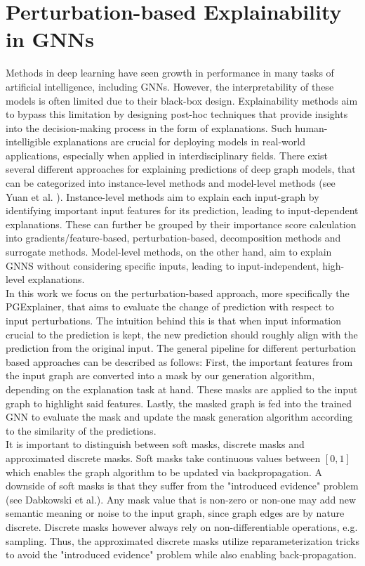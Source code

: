 \section{Perturbation-based Explainability in GNNs}
Methods in deep learning have seen growth in performance in many tasks of artificial intelligence, including GNNs. However, the interpretability of these models is often limited due to their black-box design. Explainability methods aim to bypass this limitation by designing post-hoc techniques that provide insights into the decision-making process in the form of explanations. Such human-intelligible explanations are crucial for deploying models in real-world applications, especially when applied in interdisciplinary fields. There exist several different approaches for explaining predictions of deep graph models, that can be categorized into instance-level methods and model-level methods (see Yuan et al. \cite{yuan2022explainability}). Instance-level methods aim to explain each input-graph by identifying important input features for its prediction, leading to input-dependent explanations. These can further be grouped by their importance score calculation into gradients/feature-based, perturbation-based, decomposition methods and surrogate methods. Model-level methods, on the other hand, aim to explain GNNS without considering specific inputs, leading to input-independent, high-level explanations. \\
In this work we focus on the perturbation-based approach, more specifically the PGExplainer\cite{luo2020parameterized}, that aims to evaluate the change of prediction with respect to input perturbations. The intuition behind this is that when input information crucial to the prediction is kept, the new prediction should roughly align with the prediction from the original input. The general pipeline for different perturbation based approaches can be described as follows: First, the important features from the input graph are converted into a mask by our generation algorithm, depending on the explanation task at hand. These masks are applied to the input graph to highlight said features. Lastly, the masked graph is fed into the trained GNN to evaluate the mask and update the mask generation algorithm according to the similarity of the predictions. \\
It is important to distinguish between soft masks, discrete masks and approximated discrete masks. Soft masks take continuous values between $[0,1]$ which enables the graph algorithm to be updated via backpropagation. A downside of soft masks is that they suffer from the "introduced evidence" problem (see Dabkowski et al.\cite{dabkowski2017real}). Any mask value that is non-zero or non-one may add new semantic meaning or noise to the input graph, since graph edges are by nature discrete. Discrete masks however always rely on non-differentiable operations, e.g. sampling. Thus, the approximated discrete masks utilize reparameterization tricks to avoid the "introduced evidence" problem while also enabling back-propagation. \\
